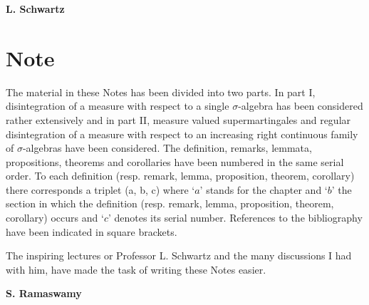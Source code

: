 \hfill{\large\bf L. Schwartz}

\eject


\chapter{Note}

The material in these Notes has been divided into two parts. In part
I, disintegration of a measure with respect to a single
$\sigma$-algebra has been considered rather extensively and in part
II, measure valued supermartingales and regular disintegration of a
measure with respect to an increasing right continuous family of
$\sigma$-algebras have been considered. The definition, remarks,
lemmata, propositions, theorems and corollaries have been numbered in
the same serial order. To each definition (resp. remark, lemma,
proposition, theorem, corollary) there corresponds a triplet (a, b,
c) where `$a$' stands for the chapter and `$b$' the section in which
the definition (resp. remark, lemma, proposition, theorem, corollary)
occurs and `$c$' denotes its serial number. References to the
bibliography have been indicated in square brackets. 

The inspiring lectures or Professor L. Schwartz and the many
discussions I had with him, have made the task of writing these Notes
easier.
\vskip 1cm

\hfill{\large\bf S. Ramaswamy}
